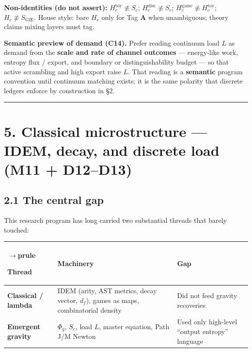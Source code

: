 \documentclass[
  11pt,
]{article}
\newcounter{none} %
\begin{document}
\textbf{Non-identities (do not assert):} \(H_c^{\mathrm{toy}}\not\equiv S_c\); \(H_c^{\mathrm{disc}}\not\equiv S_c\); \(H_c^{\mathrm{game}}\not\equiv H_c^{\mathrm{toy}}\); \(H_c\not\equiv S_{\mathrm{GfE}}\). House style: bare \(H_c\) only for Tag \textbf{A} when unambiguous; theory claims mixing layers must tag.

\textbf{Semantic preview of demand (C14).} Prefer reading continuum load \(L\) as demand from the \textbf{scale and rate of channel outcomes} --- energy-like work, entropy flux / export, and boundary or distinguishability budget --- so that active scrambling and high export raise \(L\). That reading is a \textbf{semantic} program convention until continuum matching exists; it is the same polarity that discrete ledgers enforce by construction in \S2.

\begin{center}\rule{0.5\linewidth}{0.5pt}\end{center}

\section{5. Classical microstructure --- IDEM, decay, and discrete load (M11 + D12--D13)}\label{classical-microstructure-idem-decay-and-discrete-load-m11-d12d13}

\subsection{2.1 The central gap}\label{the-central-gap}

This research program has long carried two substantial threads that barely touched:

{\def\LTcaptype{none} %
\begin{longtable}[]{@{}
  >{\raggedright\arraybackslash}p{}
  >{\raggedright\arraybackslash}p{}
  >{\raggedright\arraybackslash}p{}@{}}
$\rightarrow$prule\noalign{}
\begin{minipage}[b]{\linewidth}\raggedright
Thread
\end{minipage} & \begin{minipage}[b]{\linewidth}\raggedright
Machinery
\end{minipage} & \begin{minipage}[b]{\linewidth}\raggedright
Gap
\end{minipage} \\
\midrule\noalign{}
\endhead
\bottomrule\noalign{}
\endlastfoot
\textbf{Classical / lambda} & IDEM (arity, AST metrics, decay vector, \(d_f\)), games as maps, combinatorial density & Did not feed gravity recoveries \\
\textbf{Emergent gravity} & \(\Phi_g\), \(S_c\), load \(L\), master equation, Path J/M Newton & Used only high-level ``output entropy'' language \\
\end{longtable}
}
\end{document}
